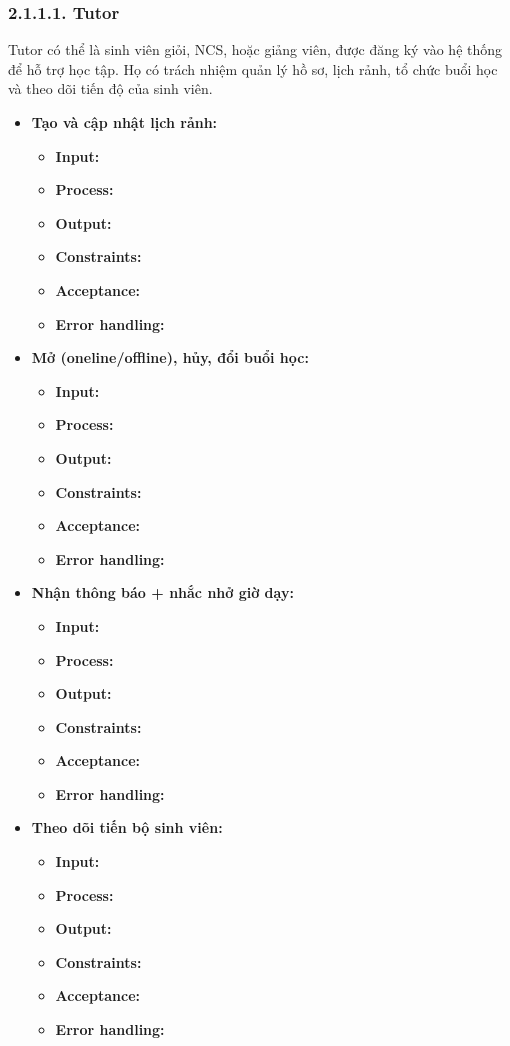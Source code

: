 \subsubsection*{2.1.1.1. Tutor}
Tutor có thể là sinh viên giỏi, NCS, hoặc giảng viên, được đăng ký vào hệ thống để hỗ trợ học tập. Họ có trách nhiệm quản lý hồ sơ, lịch rảnh, tổ chức buổi học và theo dõi tiến độ của sinh viên.
\begin{itemize}
    \item \textbf{Tạo và cập nhật lịch rảnh:}
    \begin{itemize}
        \item \textbf{Input:}
        \item \textbf{Process:}
        \item \textbf{Output:}
        \item \textbf{Constraints:}
        \item \textbf{Acceptance:}
        \item \textbf{Error handling:}
    \end{itemize}
    
    \item \textbf{Mở (oneline/offline), hủy, đổi buổi học:}
    \begin{itemize}
        \item \textbf{Input:}
        \item \textbf{Process:}
        \item \textbf{Output:}
        \item \textbf{Constraints:}
        \item \textbf{Acceptance:}
        \item \textbf{Error handling:}
    \end{itemize}
    
    \item \textbf{Nhận thông báo + nhắc nhở giờ dạy:}
    \begin{itemize}
        \item \textbf{Input:}
        \item \textbf{Process:}
        \item \textbf{Output:}
        \item \textbf{Constraints:}
        \item \textbf{Acceptance:}
        \item \textbf{Error handling:}
    \end{itemize}
    
    \item \textbf{Theo dõi tiến bộ sinh viên:}
    \begin{itemize}
        \item \textbf{Input:}
        \item \textbf{Process:}
        \item \textbf{Output:}
        \item \textbf{Constraints:}
        \item \textbf{Acceptance:}
        \item \textbf{Error handling:}
    \end{itemize}
    

\end{itemize}
